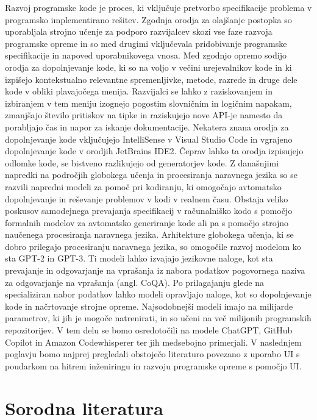 \documentclass[a4paper,12pt,openright]{book}
\begin{document}
Razvoj programske kode je proces, ki vključuje pretvorbo specifikacije problema v programsko implementirano rešitev. Zgodnja orodja za olajšanje postopka so uporabljala strojno učenje za podporo razvijalcev skozi vse faze razvoja programske opreme in so med drugimi vključevala pridobivanje programske specifikacije in napoved uporabnikovega vnosa.
Med zgodnjo opremo sodijo orodja za dopolnjevanje kode, ki so na voljo v večini urejevalnikov kode in ki izpišejo kontekstualno relevantne spremenljivke, metode, razrede in druge dele kode v obliki plavajočega menija. Razvijalci se lahko z raziskovanjem in izbiranjem v tem meniju izognejo pogostim slovničnim in logičnim napakam, zmanjšajo število pritiskov na tipke in raziskujejo nove API-je namesto da porabljajo čas in napor za iskanje dokumentacije. Nekatera znana orodja za dopolnjevanje kode vključujejo IntelliSense v Visual Studio Code in vgrajeno dopolnjevanje kode v orodjih JetBrains IDE2. 
Čeprav lahko ta orodja izpisujejo odlomke kode, se bistveno razlikujejo od generatorjev kode.
Z današnjimi napredki na področjih globokega učenja in procesiranja naravnega jezika so se razvili napredni modeli za pomoč pri kodiranju, ki omogočajo avtomatsko dopolnjevanje in reševanje problemov v kodi v realnem času.
Obstaja veliko poskusov samodejnega prevajanja specifikacij v računalniško kodo s pomočjo formalnih modelov za avtomatsko generiranje kode ali pa s pomočjo strojno naučenega procesiranja naravnega jezika. Arhitekture globokega učenja, ki se dobro prilegajo procesiranju naravnega jezika, so omogočile razvoj modelom ko sta GPT-2 in GPT-3. Ti modeli lahko izvajajo jezikovne naloge, kot sta prevajanje in odgovarjanje na vprašanja iz nabora podatkov pogovornega naziva za odgovarjanje na vprašanja (angl. CoQA). Po prilagajanju glede na specializiran nabor podatkov lahko modeli opravljajo naloge, kot so dopolnjevanje kode in načrtovanje strojne opreme.  Najsodobnejši modeli imajo na milijarde parametrov, ki jih je mogoče natrenirati, in so učeni na več milijonih programskih repozitorijev. V tem delu se bomo osredotočili na modele ChatGPT, GitHub Copilot in Amazon Codewhisperer ter jih medsebojno primerjali.
V naslednjem poglavju bomo najprej pregledali obstoječo literaturo povezano z uporabo UI s poudarkom na hitrem inženiringu in razvoju programske opreme s pomočjo UI. 
\cite{zhang2003machine}
\section{Sorodna literatura}
\end{document}
